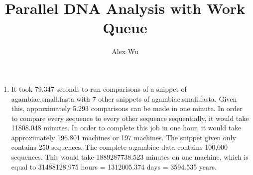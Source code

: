 \documentclass{article}
\title{Parallel DNA Analysis with Work Queue}
\author{Alex Wu}
\begin{document}
\maketitle

\begin{enumerate}
\item{%
It took 79.347 seconds to run comparisons of a snippet of agambiae.small.fasta with 7 other snippets of agambiae.small.fasta. Given this, approximately 5.293 comparisons can be made in one minute. In order to compare every sequence to every other sequence sequentially, it would take 11808.048 minutes. In order to complete this job in one hour, it would take approximately 196.801 machines or 197 machines. The snippet given only contains 250 sequences. The complete a.gambiae data contains 100,000 sequences. This would take 1889287738.523 minutes on one machine, which is equal to 31488128.975 hours = 1312005.374 days = 3594.535 years.

}


\end{enumerate}
\end{document}
